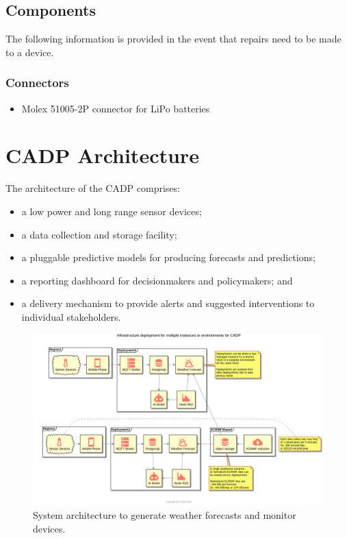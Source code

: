 \documentclass[
]{book}
\providecommand{\tightlist}{%
  \setlength{\itemsep}{0pt}\setlength{\parskip}{0pt}}
\begin{document}
\hypertarget{components}{%
\section{Components}\label{components}}

The following information is provided in the event that repairs need to be
made to a device.

\hypertarget{connectors}{%
\subsection{Connectors}\label{connectors}}

\begin{itemize}
\tightlist
\item
  Molex 51005-2P connector for LiPo batteries
\end{itemize}

\hypertarget{cadp-architecture}{%
\chapter{CADP Architecture}\label{cadp-architecture}}

The architecture of the CADP comprises:

\begin{itemize}
\tightlist
\item
  a low power and long range sensor devices;
\item
  a data collection and storage facility;
\item
  a pluggable predictive models for producing forecasts and predictions;
\item
  a reporting dashboard for decisionmakers and policymakers; and
\item
  a delivery mechanism to provide alerts and suggested interventions to individual stakeholders.
\end{itemize}

\begin{figure}

{\centering \includegraphics[width=19.33in]{images/infrastructure_deployments} 

}

\caption{System architecture to generate weather forecasts and monitor devices.}\label{fig:infrastructure-deployments}
\end{figure}
\end{document}

